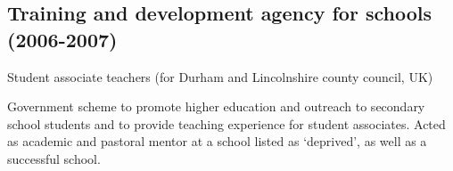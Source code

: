 \documentclass[letterpaper]{article}
\renewenvironment{itemize}{
  \begin{list}{}{
    \setlength{\leftmargin}{1.5em}
  }
}{
  \end{list}
}
\begin{document}
\subsection*{Training and development agency for schools (2006-2007)}
\begin{itemize}
	\item Student associate teachers (for Durham and Lincolnshire county
	council, UK)
\begin{itemize}
	\item[--] Government scheme to promote higher education and outreach to
	secondary school students and to provide teaching experience for student
	associates. Acted as academic and pastoral mentor at a school listed as
	`deprived', as well as a successful school.
\end{itemize}
\end{itemize}


%  
%  
\end{document}
